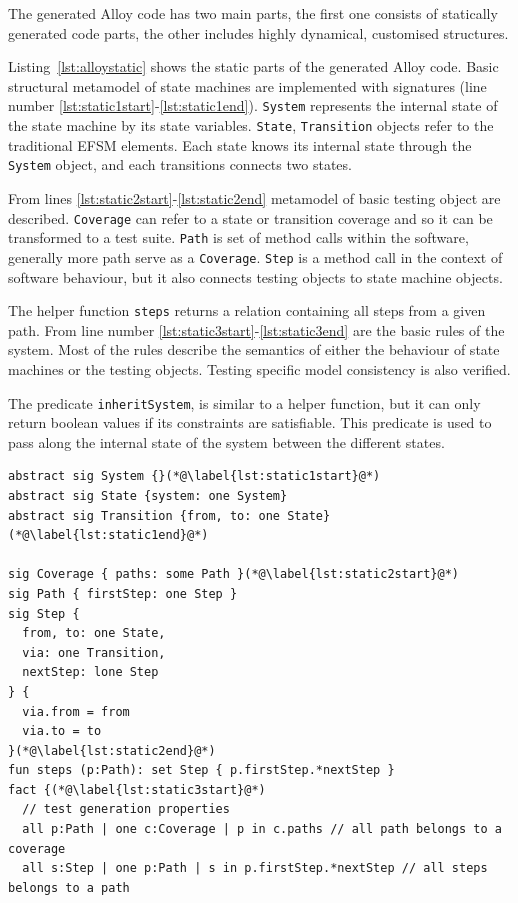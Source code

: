 \begin{description}
	The generated Alloy code has two main parts, the first one consists of statically generated code parts, the other includes highly dynamical, customised structures.
	
	Listing~\ref{lst:alloystatic} shows the static parts of the generated Alloy code. Basic structural metamodel of state machines are implemented with signatures (line number  \ref{lst:static1start}-\ref{lst:static1end}). \texttt{System} represents the internal state of the state machine by its state variables. \texttt{State}, \texttt{Transition} objects refer to the traditional EFSM elements. Each state knows its internal state through the \texttt{System} object, and each transitions connects two states.
	
	From lines \ref{lst:static2start}-\ref{lst:static2end} metamodel of basic testing object are described. \texttt{Coverage} can refer to a state or transition coverage and so it can be transformed to a test suite. \texttt{Path} is set of method calls within the software, generally more path serve as a \texttt{Coverage}. \texttt{Step} is a method call in the context of software behaviour, but it also connects testing objects to state machine objects.
	
	The helper function \texttt{steps} returns a relation containing all steps from a given path.
	From line number \ref{lst:static3start}-\ref{lst:static3end} are the basic rules of the system. Most of the rules describe the semantics of either the behaviour of state machines or the testing objects. Testing specific model consistency is also verified.

	The predicate \texttt{inheritSystem}, is similar to a helper function, but it can only return boolean values if its constraints are satisfiable. This predicate is used to pass along the internal state of the system between the different states.
	
\begin{lstlisting}[label={lst:alloystatic}, caption=Static parts of the generated Alloy code,breaklines=true]
abstract sig System {}(*@\label{lst:static1start}@*)
abstract sig State {system: one System}
abstract sig Transition {from, to: one State}(*@\label{lst:static1end}@*)

sig Coverage { paths: some Path }(*@\label{lst:static2start}@*)
sig Path { firstStep: one Step }
sig Step {
  from, to: one State,
  via: one Transition,
  nextStep: lone Step
} {
  via.from = from
  via.to = to
}(*@\label{lst:static2end}@*)
fun steps (p:Path): set Step { p.firstStep.*nextStep }
fact {(*@\label{lst:static3start}@*)
  // test generation properties
  all p:Path | one c:Coverage | p in c.paths // all path belongs to a coverage
  all s:Step | one p:Path | s in p.firstStep.*nextStep // all steps belongs to a path


\end{lstlisting}
\end{description}
